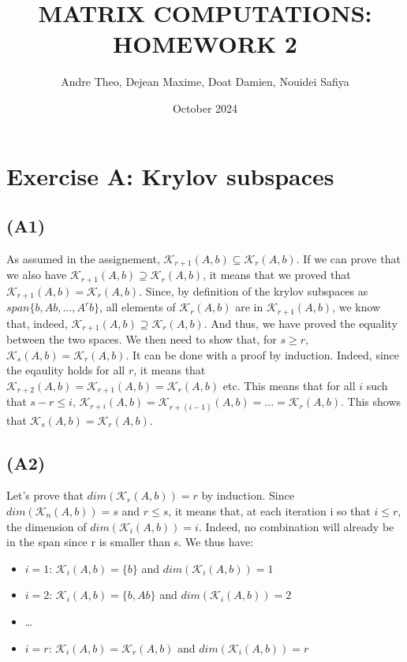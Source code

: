 \documentclass{article}
\title{\textbf{MATRIX COMPUTATIONS: HOMEWORK 2}}  %
\author{Andre Theo,
Dejean Maxime,
Doat Damien,
Nouidei Safiya}
\date{October 2024}
\begin{document}
\maketitle

\section{Exercise A: Krylov subspaces}
\subsection*{(A1)}
As assumed in the assignement, $\mathcal{K}_{r+1}(A,b) \subseteq \mathcal{K}_{r}(A,b) $. 
If we can prove that we also have $\mathcal{K}_{r+1}(A,b) \supseteq \mathcal{K}_{r}(A,b) $, it means that we proved that $\mathcal{K}_{r+1}(A,b) = \mathcal{K}_{r}(A,b) $. 
Since, by definition of the krylov subspaces as $span\{b, Ab, ..., A^rb\}$,  all elements of $\mathcal{K}_{r}(A,b)$ are in $\mathcal{K}_{r+1}(A,b)$, we know that, indeed, $\mathcal{K}_{r+1}(A,b) \supseteq \mathcal{K}_{r}(A,b) $. And thus, we have proved the equality between the two spaces. 
We then need to show that, for $s\geq r$, $\mathcal{K}_{s}(A,b) = \mathcal{K}_{r}(A,b) $. It can be done with a proof by induction. 
Indeed, since the eqaulity holds for all $r$, it means that $\mathcal{K}_{r+2}(A,b) = \mathcal{K}_{r+1}(A,b) = \mathcal{K}_{r}(A,b) $ etc. This means that for all $i$ such that $s-r\leq i$, $\mathcal{K}_{r+i}(A,b) = \mathcal{K}_{r+(i-1)}(A,b) =... =  \mathcal{K}_{r}(A,b) $. 
This shows that $\mathcal{K}_{s}(A,b) = \mathcal{K}_{r}(A,b) $.


\subsection*{(A2)}
Let's prove that $ dim( \mathcal{K}_r (A,b)) = r$ by induction. Since $ dim( \mathcal{K}_n (A,b)) = s$ and $r \leq s$, it means that, 
at each iteration i so that $i \leq r$, the dimension of  $ dim( \mathcal{K}_i (A,b)) = i$. Indeed, no combination will already be in the span
since r is smaller than s. 
We thus have:
\begin{itemize}
    \item $i = 1$: $ \mathcal{K}_i (A,b) = \{b\}$ and $dim( \mathcal{K}_i (A,b)) = 1$
    \item $i = 2$: $ \mathcal{K}_i (A,b) = \{b, Ab\}$ and $dim( \mathcal{K}_i (A,b)) = 2$
    \item \dots
    \item $i = r$: $ \mathcal{K}_i (A,b) = \mathcal{K}_r (A,b) $ and $dim( \mathcal{K}_i (A,b)) = r$
\end{itemize}
\end{document}
